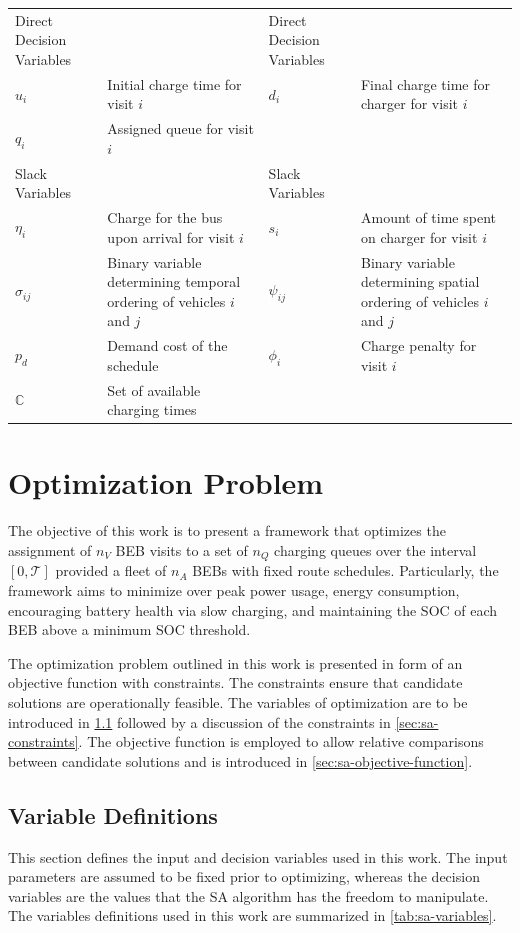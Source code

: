 \documentclass[energies,article,submit,moreauthors]{Definitions/mdpi}
\newcommand{\T}{\mathcal{T}}                %
\newcommand{\C}{\mathbb{C}}                 %
\begin{document}
\begin{table}[htbp]
\begin{tabularx}{\textwidth}{L{0.3} L{1.2} L{0.3} L{1.2}}
\hline
Direct Decision Variables &  & Direct Decision Variables & \\[0pt]
\(u_i\) & Initial charge time for visit \(i\) & \(d_i\) & Final charge time for charger for visit \(i\)\\[0pt]
\(q_i\) & Assigned queue for visit \(i\) &  & \\[0pt]
Slack Variables &  & Slack Variables & \\[0pt]
\(\eta_i\) & Charge for the bus upon arrival for visit \(i\) & \(s_i\) & Amount of time spent on charger for visit \(i\)\\[0pt]
\(\sigma_{ij}\) & Binary variable determining temporal ordering of vehicles \(i\) and \(j\) & \(\psi_{ij}\) & Binary variable determining spatial ordering of vehicles \(i\) and \(j\)\\[0pt]
\(p_{d}\) & Demand cost of the schedule & \(\phi_i\) & Charge penalty for visit \(i\)\\[0pt]
\(\C\) & Set of available charging times &  & \\[0pt]
\hline
\end{tabularx}
\end{table}
\section{Optimization Problem}
\label{sec:sa-optimization-problem}
The objective of this work is to present a framework that optimizes the assignment of \(n_V\) BEB visits to a set of \(n_Q\)
charging queues over the interval \([0,\T]\) provided a fleet of \(n_A\) BEBs with fixed route schedules. Particularly, the
framework aims to minimize over peak power usage, energy consumption, encouraging battery health via slow charging, and
maintaining the SOC of each BEB above a minimum SOC threshold.

The optimization problem outlined in this work is presented in form of an objective function with constraints. The
constraints ensure that candidate solutions are operationally feasible. The variables of optimization are to be
introduced in \ref{sec:sa-parameter-definitions} followed by a discussion of the constraints in \ref{sec:sa-constraints}. The
objective function is employed to allow relative comparisons between candidate solutions and is introduced in
\ref{sec:sa-objective-function}.

\subsection{Variable Definitions}
\label{sec:sa-parameter-definitions}
This section defines the input and decision variables used in this work. The input parameters are assumed to be fixed
prior to optimizing, whereas the decision variables are the values that the SA algorithm has the freedom to manipulate.
The variables definitions used in this work are summarized in \ref{tab:sa-variables}.
\end{document}
